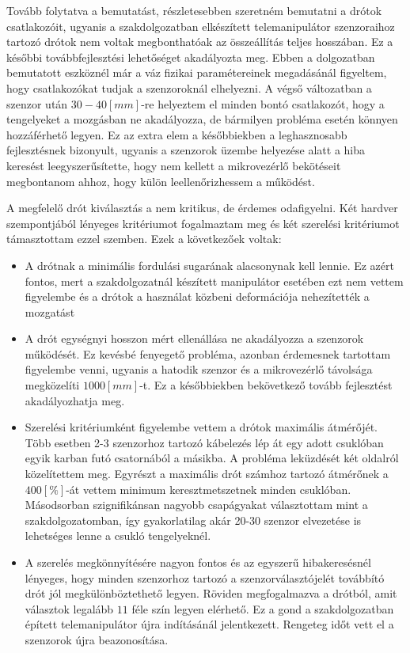 Tovább folytatva a bemutatást, részletesebben szeretném bemutatni a drótok csatlakozóit, ugyanis a szakdolgozatban elkészített telemanipulátor szenzoraihoz tartozó drótok nem voltak megbonthatóak az összeállítás teljes hosszában. Ez a későbbi továbbfejlesztési lehetőséget akadályozta meg. Ebben a dolgozatban bemutatott eszköznél már a váz fizikai paramétereinek megadásánál figyeltem, hogy csatlakozókat tudjak a szenzoroknál elhelyezni. A végső változatban a szenzor után $30-40[mm]$-re helyeztem el minden bontó csatlakozót, hogy a tengelyeket a mozgásban ne akadályozza, de bármilyen probléma esetén könnyen hozzáférhető legyen. Ez az extra elem a későbbiekben a leghasznosabb fejlesztésnek bizonyult, ugyanis a szenzorok üzembe helyezése alatt a hiba keresést leegyszerűsítette, hogy nem kellett a mikrovezérlő bekötéseit megbontanom ahhoz, hogy külön leellenőrizhessem a működést.

A megfelelő drót kiválasztás a nem kritikus, de érdemes odafigyelni. Két hardver szempontjából lényeges kritériumot fogalmaztam meg és két szerelési kritériumot támasztottam ezzel szemben. Ezek a következőek voltak:

\begin{itemize}
  \item A drótnak a minimális fordulási sugarának alacsonynak kell lennie. Ez azért fontos, mert a szakdolgozatnál készített manipulátor esetében ezt nem vettem figyelembe és a drótok a használat közbeni deformációja nehezítették a mozgatást
  \item A drót egységnyi hosszon mért ellenállása ne akadályozza a szenzorok működését. Ez kevésbé fenyegető probléma, azonban érdemesnek tartottam figyelembe venni, ugyanis a hatodik szenzor és a mikrovezérlő távolsága megközelíti $1000[mm]$-t. Ez a későbbiekben bekövetkező tovább fejlesztést akadályozhatja meg.
  \item Szerelési kritériumként figyelembe vettem a drótok maximális átmérőjét. Több esetben 2-3 szenzorhoz tartozó kábelezés lép át egy adott csuklóban egyik karban futó csatornából a másikba. A probléma leküzdését két oldalról közelítettem meg. Egyrészt a maximális drót számhoz tartozó átmérőnek a $400[\%]$-át vettem minimum keresztmetszetnek minden csuklóban. Másodsorban szignifikánsan nagyobb csapágyakat választottam mint a szakdolgozatomban, így gyakorlatilag akár 20-30 szenzor elvezetése is lehetséges lenne a csukló tengelyeknél.
  \item A szerelés megkönnyítésére nagyon fontos és az egyszerű hibakeresésnél lényeges, hogy minden szenzorhoz tartozó a szenzorválasztójelét továbbító drót jól megkülönböztethető legyen. Röviden megfogalmazva a drótból, amit választok legalább $11$ féle szín legyen elérhető. Ez a gond a szakdolgozatban épített telemanipulátor újra indításánál jelentkezett. Rengeteg időt vett el a szenzorok újra beazonosítása.
\end{itemize}

